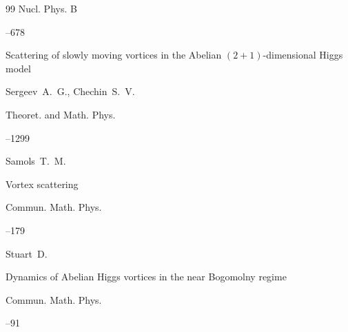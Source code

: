 \begin{thebibliography}{99}
\jour Nucl. Phys. B 




--678





\paper Scattering of slowly moving vortices in the Abelian $(2+1)$-dimensional Higgs model

\by  Sergeev~A.~G., Chechin~S.~V. 

\jour Theoret. and Math. Phys.




--1299








\by  Samols~T.~M.

\paper Vortex scattering

\jour  Commun. Math. Phys.




--179









\by Stuart~D.

\paper  Dynamics of Abelian Higgs vortices in the near Bogomolny regime 

\jour Commun. Math. Phys. 




--91







\end{thebibliography}
